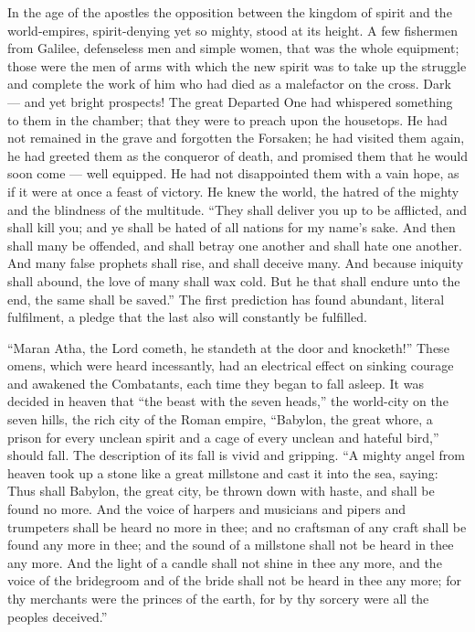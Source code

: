 \documentclass[12pt,a4paper,openany]{book}
\newcommand{\opage}[1]{\marginnote{\footnotesize\textit{[#1]}}}
\newcounter{lect}
\begin{document}
In the age of the apostles the opposition between the kingdom of spirit
and the world-empires, spirit-denying yet so mighty,
stood at its height. A few fishermen from Galilee,
defenseless men and simple women, that was the whole
equipment; those were the men of arms with which
the new spirit was to take up the struggle and complete the
work of him who had died as a malefactor on the cross. Dark
--- and yet bright prospects! The great Departed One had
whispered something to them in the chamber; that they were to preach
upon the housetops. He had not remained in the grave and
forgotten the Forsaken; he had visited them again,
he had greeted them as the conqueror of death, and promised
them that he would soon come --- well equipped. He
\setcounter{footnote}{0}%
\opage{47}had not disappointed them with a vain hope, as
if it were at once a feast of victory. He knew the world, the
hatred of the mighty and the blindness of the multitude. ``They shall
deliver you up to be afflicted, and shall kill you;
and ye shall be hated of all nations for my name's sake.
And then shall many be offended, and shall betray one another
and shall hate one another. And many false prophets shall
rise, and shall deceive many. And because iniquity
shall abound, the love of many shall wax
cold. But he that shall endure unto
the end, the same shall be saved.'' The first prediction
has found abundant, literal fulfilment, a pledge
that the last also will constantly be fulfilled.

``Maran Atha, the Lord cometh, he standeth at
the door and knocketh!'' These omens, which were heard incessantly,
had an electrical effect on sinking courage and awakened the
Combatants, each time they began to fall asleep. It
was decided in heaven that ``the beast with the seven heads,''
the world-city on the seven hills, the rich
city of the Roman empire, ``Babylon, the great whore, a prison for every
unclean spirit and a cage of every unclean and hateful bird,''
should fall. The description of its fall is vivid
and gripping. ``A mighty angel from heaven took up
a stone like a great millstone and cast it into the
sea, saying: Thus shall Babylon, the great city, be thrown down
with haste, and shall be found no more. And the voice of harpers
and musicians and pipers and trumpeters shall
be heard no more in thee; and no craftsman of any
craft shall be found any more in thee; and the sound of a millstone shall not be heard in
thee any more. And the light of a candle shall not shine in thee
any more, and the voice of the bridegroom and of the bride shall not be heard in thee
\setcounter{footnote}{0}%
\opage{48}any more; for thy merchants were the princes of the earth,
for by thy sorcery were all the peoples deceived.''
\end{document}
